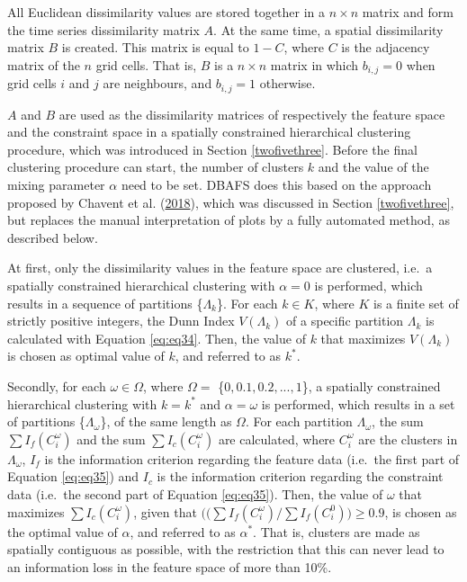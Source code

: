 \documentclass[12pt,oneside]{reedthesis}
\begin{document}
All Euclidean dissimilarity values are stored together in a
\(n \times n\) matrix and form the time series dissimilarity matrix
\(A\). At the same time, a spatial dissimilarity matrix \(B\) is
created. This matrix is equal to \(1-C\), where \(C\) is the adjacency
matrix of the \(n\) grid cells. That is, \(B\) is a \(n \times n\)
matrix in which \(b_{i,j} = 0\) when grid cells \(i\) and \(j\) are
neighbours, and \(b_{i,j} = 1\) otherwise.

\(A\) and \(B\) are used as the dissimilarity matrices of respectively
the feature space and the constraint space in a spatially constrained
hierarchical clustering procedure, which was introduced in Section
\ref{twofivethree}. Before the final clustering procedure can start, the
number of clusters \(k\) and the value of the mixing parameter
\(\alpha\) need to be set. DBAFS does this based on the approach
proposed by Chavent et al. (\protect\hyperlink{ref-clustgeo}{2018}),
which was discussed in Section \ref{twofivethree}, but replaces the
manual interpretation of plots by a fully automated method, as described
below.

At first, only the dissimilarity values in the feature space are
clustered, i.e.~a spatially constrained hierarchical clustering with
\(\alpha = 0\) is performed, which results in a sequence of partitions
\{\(\Lambda_{k}\)\}. For each \(k \in K\), where \(K\) is a finite set
of strictly positive integers, the Dunn Index \(V(\Lambda_{k})\) of a
specific partition \(\Lambda_{k}\) is calculated with Equation
\eqref{eq:eq34}. Then, the value of \(k\) that maximizes
\(V(\Lambda_{k})\) is chosen as optimal value of \(k\), and referred to
as \(k^{*}\).

Secondly, for each \(\omega \in \Omega\), where \(\Omega =\)
\{\(0, 0.1, 0.2, ..., 1\)\}, a spatially constrained hierarchical
clustering with \(k = k^{*}\) and \(\alpha = \omega\) is performed,
which results in a set of partitions \{\(\Lambda_{\omega}\)\}, of the
same length as \(\Omega\). For each partition \(\Lambda_{\omega}\), the
sum \(\sum I_{f}(C_{i}^{\omega})\) and the sum
\(\sum I_{c}(C_{i}^{\omega})\) are calculated, where \(C_{i}^{\omega}\)
are the clusters in \(\Lambda_{\omega}\), \(I_{f}\) is the information
criterion regarding the feature data (i.e.~the first part of Equation
\eqref{eq:eq35}) and \(I_{c}\) is the information criterion regarding the
constraint data (i.e.~the second part of Equation \eqref{eq:eq35}). Then,
the value of \(\omega\) that maximizes \(\sum I_{c}(C_{i}^{\omega})\),
given that
\(\big((\sum I_{f}(C_{i}^{\omega}) / \sum I_{f}(C_{i}^{0})\big) \geq 0.9\),
is chosen as the optimal value of \(\alpha\), and referred to as
\(\alpha^{*}\). That is, clusters are made as spatially contiguous as
possible, with the restriction that this can never lead to an
information loss in the feature space of more than 10\%.
\end{document}
